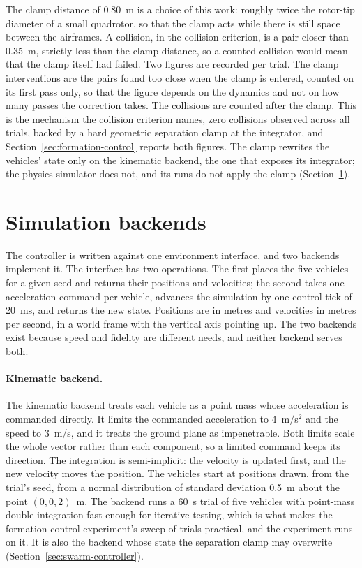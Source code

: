 The clamp distance of 0.80~m is a choice of this work: roughly twice the rotor-tip diameter of a
small quadrotor, so that the clamp acts while there is still space between the airframes. A
collision, in the collision criterion, is a pair closer than 0.35~m, strictly less than the clamp
distance, so a counted collision would mean that the clamp itself had failed. Two figures are
recorded per trial. The clamp interventions are the pairs found too close when the clamp is
entered, counted on its first pass only, so that the figure depends on the dynamics and not on how
many passes the correction takes. The collisions are counted after the clamp. This is the
mechanism the collision criterion names, zero collisions observed across all trials, backed by a
hard geometric separation clamp at the integrator, and Section~\ref{sec:formation-control}
reports both figures. The clamp rewrites the vehicles' state only on the kinematic backend, the one
that exposes its integrator; the physics simulator does not, and its runs do not apply the clamp
(Section~\ref{sec:simulation-backends}).

\section{Simulation backends}
\label{sec:simulation-backends}
The controller is written against one environment interface, and two backends implement it. The
interface has two operations. The first places the five vehicles for a given seed and returns their
positions and velocities; the second takes one acceleration command per vehicle, advances the
simulation by one control tick of 20~ms, and returns the new state. Positions are in metres and
velocities in metres per second, in a world frame with the vertical axis pointing up. The two
backends exist because speed and fidelity are different needs, and neither backend serves both.

\paragraph{Kinematic backend.} The kinematic backend treats each vehicle as a point mass whose
acceleration is commanded directly. It limits the commanded acceleration to 4~m/s$^2$ and the
speed to 3~m/s, and it treats the ground plane as impenetrable. Both limits scale the whole vector
rather than each component, so a limited command keeps its direction. The integration is
semi-implicit: the velocity is updated first, and the new velocity moves the position. The vehicles start at positions drawn, from the trial's seed, from a normal distribution of
standard deviation 0.5~m about the point $(0, 0, 2)$~m. The backend runs a 60~s trial of five
vehicles with point-mass double integration fast enough for iterative testing, which is what makes the formation-control experiment's sweep of trials
practical, and the experiment runs on it. It is also the backend whose state the separation clamp
may overwrite (Section~\ref{sec:swarm-controller}).

